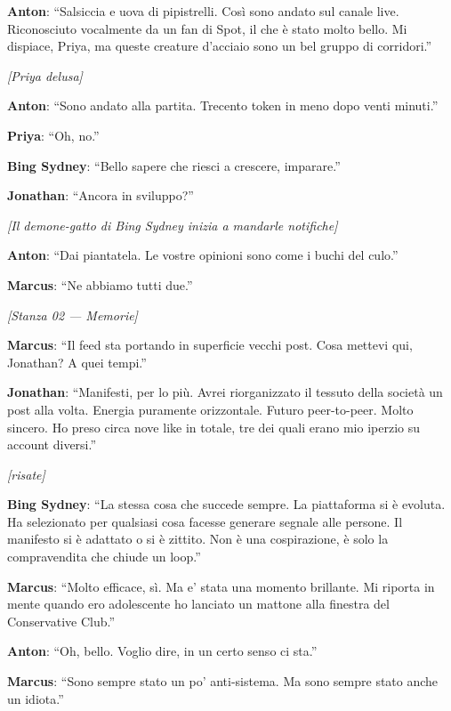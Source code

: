 \noindent\textbf{Anton}: ``Salsiccia e uova di pipistrelli. Così sono andato sul canale live. Riconosciuto vocalmente da un fan di Spot, il che è stato molto bello. Mi dispiace, Priya, ma queste creature d'acciaio sono un bel gruppo di corridori.''

\noindent\textit{[Priya delusa]}

\noindent\textbf{Anton}: ``Sono andato alla partita. Trecento token in meno dopo venti minuti.''

\noindent\textbf{Priya}: ``Oh, no.''

\noindent\textbf{Bing Sydney}: ``Bello sapere che riesci a crescere, imparare.''

\noindent\textbf{Jonathan}: ``Ancora in sviluppo?''

\noindent\textit{[Il demone-gatto di Bing Sydney inizia a mandarle notifiche]}

\noindent\textbf{Anton}: ``Dai piantatela. Le vostre opinioni sono come i buchi del culo.''

\noindent\textbf{Marcus}: ``Ne abbiamo tutti due.''

\medskip
\begin{center}
{\small\sffamily\color{nullmesh-ghost}\textit{[Stanza 02 --- Memorie]}}
\end{center}
\medskip

\noindent\textbf{Marcus}: ``Il feed sta portando in superficie vecchi post. Cosa mettevi qui, Jonathan? A quei tempi.''

\noindent\textbf{Jonathan}: ``Manifesti, per lo più. Avrei riorganizzato il tessuto della società un post alla volta. Energia puramente orizzontale. Futuro peer-to-peer. Molto sincero. Ho preso circa nove like in totale, tre dei quali erano mio iperzio su account diversi.''

\noindent\textit{[risate]}

\noindent\textbf{Bing Sydney}: ``La stessa cosa che succede sempre. La piattaforma si è evoluta. Ha selezionato per qualsiasi cosa facesse generare segnale alle persone. Il manifesto si è adattato o si è zittito. Non è una cospirazione, è solo la compravendita che chiude un loop.''

\noindent\textbf{Marcus}: ``Molto efficace, sì. Ma e' stata una momento brillante. Mi riporta in mente quando ero adolescente ho lanciato un mattone alla finestra del Conservative Club.''

\noindent\textbf{Anton}: ``Oh, bello. Voglio dire, in un certo senso ci sta.''

\noindent\textbf{Marcus}: ``Sono sempre stato un po' anti-sistema. Ma sono sempre stato anche un idiota.''

